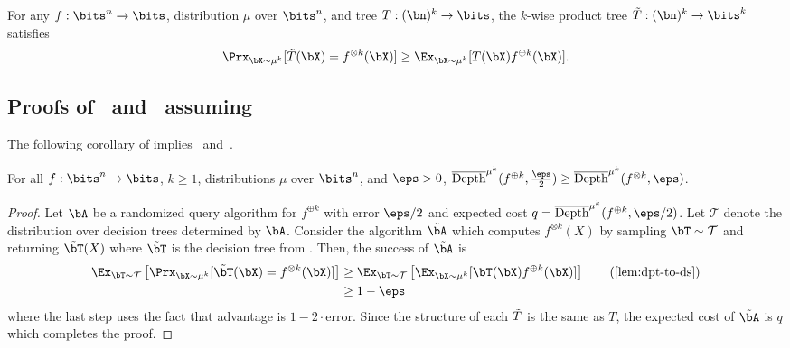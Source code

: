 \documentclass[11pt]{article}
\begin{document}
\begin{lemma}
\label{lem:dpt-to-ds}
    For any $f:\bits^n \to \bits$, distribution $\mu$ over $\bits^n$, and tree $T:(\bn)^k \to \bits$, the $k$-wise product tree $\Tilde{T}:(\bn)^k \to \bits^k$ satisfies
    \begin{equation*}
        \Prx_{\bX \sim \mu^{k}}[\tilde{T}(\bX) = f^{\otimes k}(\bX)] \geq \Ex_{\bX \sim \mu^{k}}[T(\bX)f^{\oplus k}(\bX)].
    \end{equation*}
\end{lemma}



\subsection{Proofs of~ and~ assuming~}
The following corollary of  implies~ and~.
\begin{corollary}
    \label{cor:xor-to-dp-for-r}
    For all $f:\bits^n\to\bits$, $k\ge 1$, distributions $\mu$ over $\bits^n$, and $\eps>0$, $\overline{\mathrm{Depth}}^{\mu^{k}}(f^{\oplus k},\frac{\eps}{2})\ge \overline{\mathrm{Depth}}^{\mu^{k}}(f^{\otimes k},\eps)$.
\end{corollary}
\begin{proof}
    Let $\bA$ be a randomized query algorithm for $f^{\oplus k}$ with error $\eps/2$ and expected cost $q=\overline{\mathrm{Depth}}^{\mu^{k}}(f^{\oplus k},\eps/2)$. Let $\mathcal{T}$ denote the distribution over decision trees determined by $\bA$. Consider the algorithm $\Tilde{\bA}$ which computes $f^{\otimes k}(X)$ by sampling $\bT\sim\mathcal{T}$ and returning $\Tilde{\bT}(X)$ where $\Tilde{\bT}$ is the decision tree from . Then, the success of $\Tilde{\bA}$ is
    \begin{align*}
        \Ex_{\bT\sim \mathcal{T}}\left[\Prx_{\bX\sim \mu^{k}}[\Tilde{\bT}(\bX)=f^{\otimes k}(\bX)]\right]&\ge \Ex_{\bT\sim \mathcal{T}}\left[\Ex_{\bX\sim\mu^{k}}[\bT(\bX)f^{\oplus k}(\bX)]\right]\tag{\Cref{lem:dpt-to-ds}}\\
        &\ge 1-\eps
    \end{align*}
    where the last step uses the fact that advantage is $1-2\cdot\mathrm{error}$. Since the structure of each $\Tilde{T}$ is the same as $T$, the expected cost of $\Tilde{\bA}$ is $q$ which completes the proof.
\end{proof}
\end{document}

